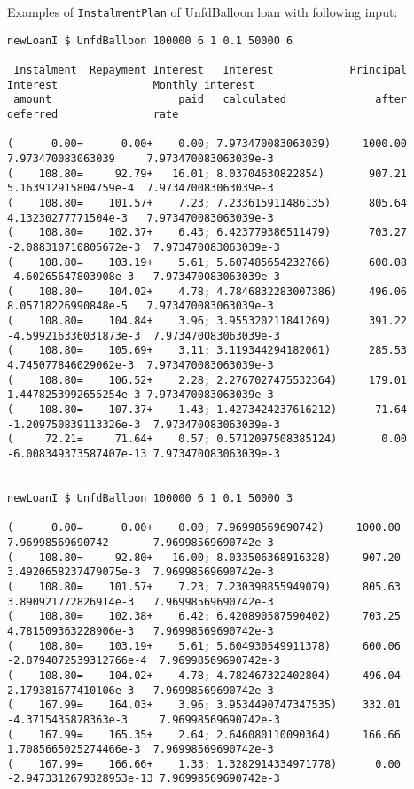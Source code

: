 \documentclass[letterpaper,11pt]{article}
\begin{document}
Examples of {\tt InstalmentPlan} of UnfdBalloon loan with following input:
{\footnotesize
\begin{verbatim}
newLoanI $ UnfdBalloon 100000 6 1 0.1 50000 6

 Instalment  Repayment Interest   Interest            Principal  Interest               Monthly interest
 amount                    paid   calculated              after  deferred               rate

(      0.00=      0.00+    0.00; 7.973470083063039)     1000.00  7.973470083063039     7.973470083063039e-3
(    108.80=     92.79+   16.01; 8.03704630822854)       907.21  5.163912915804759e-4  7.973470083063039e-3
(    108.80=    101.57+    7.23; 7.233615911486135)      805.64  4.13230277771504e-3   7.973470083063039e-3
(    108.80=    102.37+    6.43; 6.423779386511479)      703.27 -2.088310710805672e-3  7.973470083063039e-3
(    108.80=    103.19+    5.61; 5.607485654232766)      600.08 -4.60265647803908e-3   7.973470083063039e-3
(    108.80=    104.02+    4.78; 4.7846832283007386)     496.06  8.05718226990848e-5   7.973470083063039e-3
(    108.80=    104.84+    3.96; 3.955320211841269)      391.22 -4.599216336031873e-3  7.973470083063039e-3
(    108.80=    105.69+    3.11; 3.119344294182061)      285.53  4.745077846029062e-3  7.973470083063039e-3
(    108.80=    106.52+    2.28; 2.2767027475532364)     179.01  1.4478253992655254e-3 7.973470083063039e-3
(    108.80=    107.37+    1.43; 1.4273424237616212)      71.64 -1.209750839113326e-3  7.973470083063039e-3
(     72.21=     71.64+    0.57; 0.5712097508385124)       0.00 -6.008349373587407e-13 7.973470083063039e-3


newLoanI $ UnfdBalloon 100000 6 1 0.1 50000 3

(      0.00=      0.00+    0.00; 7.96998569690742)     1000.00  7.96998569690742       7.96998569690742e-3
(    108.80=     92.80+   16.00; 8.033506368916328)     907.20  3.4920658237479075e-3  7.96998569690742e-3
(    108.80=    101.57+    7.23; 7.230398855949079)     805.63  3.890921772826914e-3   7.96998569690742e-3
(    108.80=    102.38+    6.42; 6.420890587590402)     703.25  4.781509363228906e-3   7.96998569690742e-3
(    108.80=    103.19+    5.61; 5.604930549911378)     600.06 -2.8794072539312766e-4  7.96998569690742e-3
(    108.80=    104.02+    4.78; 4.782467322402804)     496.04  2.179381677410106e-3   7.96998569690742e-3
(    167.99=    164.03+    3.96; 3.9534490747347535)    332.01 -4.3715435878363e-3     7.96998569690742e-3
(    167.99=    165.35+    2.64; 2.646080110090364)     166.66  1.7085665025274466e-3  7.96998569690742e-3
(    167.99=    166.66+    1.33; 1.3282914334971778)      0.00 -2.9473312679328953e-13 7.96998569690742e-3
\end{verbatim}
}
\end{document}
